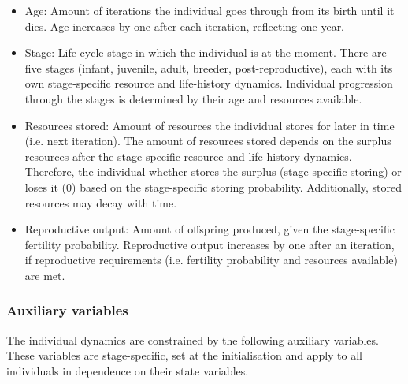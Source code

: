 \documentclass{article}
\begin{document}
\begin{itemize}
\begin{itemize}
        \item Age: Amount of iterations the individual goes through from its birth until it dies. Age increases by one after each iteration, reflecting one year.
        \item Stage: Life cycle stage in which the individual is at the moment. There are five stages (infant, juvenile, adult, breeder, post-reproductive), each with its own stage-specific resource and life-history dynamics. Individual progression through the stages is determined by their age and resources available.
        \item Resources stored: Amount of resources the individual stores for later in time (i.e. next iteration). The amount of resources stored depends on the surplus resources after the stage-specific resource and life-history dynamics. Therefore, the individual whether stores the surplus (stage-specific storing) or loses it (0) based on the stage-specific storing probability. Additionally, stored resources may decay with time.
        \item Reproductive output: Amount of offspring produced, given the stage-specific fertility probability. Reproductive output increases by one after an iteration, if reproductive requirements (i.e. fertility probability and resources available) are met.
    \end{itemize}
\end{itemize}

\subsubsection{Auxiliary variables}

The individual dynamics are constrained by the following auxiliary variables. These variables are stage-specific, set at the initialisation and apply to all individuals in dependence on their state variables.
\end{document}
